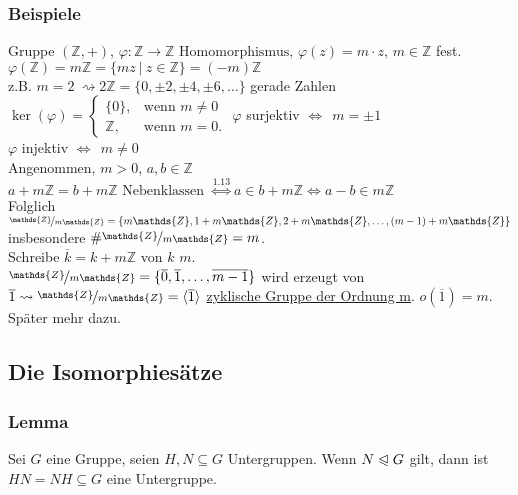 \subsubsection*{Beispiele}
Gruppe $(\mathds{Z},+)$, $\varphi: \mathds{Z} \to \mathds{Z} \text{ Homomorphismus, }\varphi(z)=m\cdot z$, $m \in \mathds{Z}$ fest.\\
$\varphi(\mathds{Z})=m\mathds{Z}=\{mz~|~z\in \mathds{Z}\}=(-m)\mathds{Z}$\\
z.B. $m=2~\rightsquigarrow 2\mathds{Z}=\{0,\pm 2,\pm 4,\pm 6,\dots\}$ gerade Zahlen\\
$\ker(\varphi)=\left\{\begin{array}{cl} \{0\}, & \text{wenn }m\not=0\\ \mathds{Z}, & \text{wenn } m=0. \end{array}\right.$
$\varphi$ surjektiv $\Leftrightarrow~~m=\pm 1$\\
$\varphi$ injektiv $\Leftrightarrow~~m\not=0$\\

Angenommen, $m>0$, $a,b \in \mathds{Z}$\\
$a+m\mathds{Z}=b+m\mathds{Z} \text{ Nebenklassen }\stackrel{\hyperref[sub:nebenklassen]{1.13}}{\Leftrightarrow} a\in b+m\mathds{Z} \Leftrightarrow a-b \in m\mathds{Z}$\\
Folglich $\nicefrac{\mathds{Z}}{m\mathds{Z}}=\{m\mathds{Z},1+m\mathds{Z},2+m\mathds{Z},\dots,(m-1)+m\mathds{Z} \}$ insbesondere $\#\nicefrac{\mathds{Z}}{m\mathds{Z}}=m$.\\
Schreibe $\overline{k}=k+m\mathds{Z}$  von $k$  $m$.\\
$\nicefrac{\mathds{Z}}{m\mathds{Z}}=\{\overline{0},\overline{1},\dots,\overline{m-1} \}$ wird erzeugt von $\overline{1} \rightsquigarrow \nicefrac{\mathds{Z}}{m\mathds{Z}}=\lh{\overline{1}}$ \uline{zyklische Gruppe der Ordnung m}. 
$o(\overline{1})=m$. 
Später mehr dazu.

\subsection{Die Isomorphiesätze}
\label{sub:isomorphiesaetze}
\subsubsection*{Lemma}
Sei $G$ eine Gruppe, seien $H,N \subseteq G$ Untergruppen. 
Wenn $N\trianglelefteqslant G$ gilt, dann ist $ HN=NH \subseteq G$ eine Untergruppe.\\

